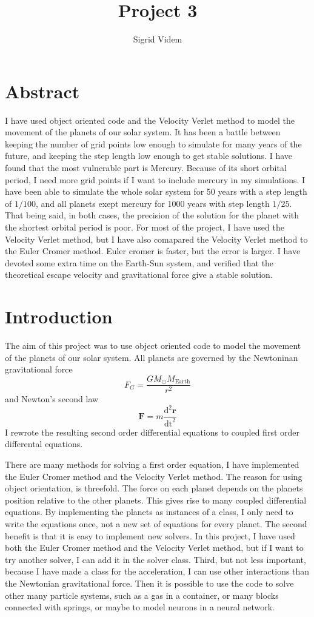 \documentclass{article}
\author{Sigrid Videm}
\title{Project 3}
\begin{document}
\maketitle
\tableofcontents %

\section{Abstract} 
I have used object oriented code and the Velocity Verlet method to model the movement of the planets of our solar system. It has been a battle between keeping the number of grid points low enough to simulate for many years of the future, and keeping the step length low enough to get stable solutions. I have found that the most vulnerable part is Mercury. Because of its short orbital period, I need more grid points if I want to include mercury in my simulations. I have been able to simulate the whole solar system for 50 years with a step length of $1/100$, and all planets exept mercury for 1000 years with step length $1/25$. That being said, in both cases, the precision of the solution for the planet with the shortest orbital period is poor. For most of the project, I have used the Velocity Verlet method, but I have also comapared the Velocity Verlet method to the Euler Cromer method. Euler cromer is faster, but the error is larger. 
I have devoted some extra time on the Earth-Sun system, and verified that the theoretical escape velocity and gravitational force give a stable solution.
\section{Introduction}
The aim of this project was to use object oriented code to model the movement of the planets of our solar system. All planets are governed by the Newtoninan gravitational force
 $$F_G=\frac{GM_{\odot}M_{\mathrm{Earth}}}{r^2}$$ 
and Newton's second law
$$
\bm{F}=m \frac{\textrm{d}^2 \bm{r}}{\textrm{dt}^2}$$
I rewrote the resulting second order differential equations to coupled first order differental equations. 

There are many methods for solving a first order equation, I have implemented the Euler Cromer method and the Velocity Verlet method.
The reason for using object orientation, is threefold. The force on each planet depends on the planets position relative to the other planets. This gives rise to many coupled differential equations. By implementing the planets as instances of a class, I only need to write the equations once, not a new set of equations for every planet. The second benefit is that it is easy to implement new solvers. In this project, I have used both the Euler Cromer method and the Velocity Verlet method, but if I want to try another solver, I can add it in the solver class. Third, but not less important, because I have made a class for the acceleration, I can use other interactions than the Newtonian gravitational force. Then it is possible to use the code to solve other many particle systems, such as a gas in a container, or many blocks connected with springs, or maybe to model neurons in a neural network.
\end{document}
